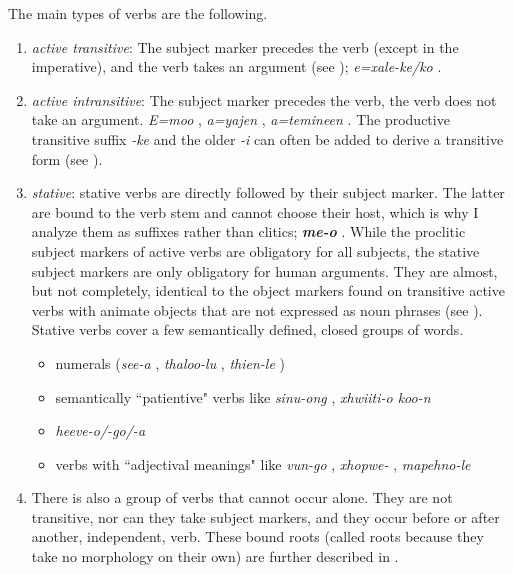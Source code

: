 The main types of verbs are the following.
\begin{enumerate}
	\item \emph{active transitive}: The subject marker precedes the verb (except in the imperative), and the verb takes an argument (see ); \textit{{e=xale-ke/ko}} .
	
	\item \emph{active intransitive}: The subject marker precedes the verb, the verb does not take an argument. \textit{{E=moo}} , \textit{a=yajen} , \textit{a=temineen} . The productive transitive suffix \textit{-ke} and the older \textit{-i} can often be added to derive a transitive form (see ).
	
	\item \emph{stative}: stative verbs are directly followed by their subject marker. The latter are bound to the verb stem and cannot choose their host, which is why I analyze them as suffixes rather than clitics; \textbf{\textit{me-o}} . While the proclitic subject markers of active verbs are obligatory for all subjects, the stative subject markers are only obligatory for human arguments. They are almost, but not completely, identical to the object markers found on transitive active verbs with animate objects that are not expressed as noun phrases (see ). Stative verbs cover a few semantically defined, closed groups of words.
	\begin{itemize}
	\sloppy
		\item numerals (\textit{see-a} , \textit{thaloo-lu} , \textit{thien-le} )
		\item semantically ``patientive" verbs like \textit{sinu-ong}  , \textit{xhwiiti-o koo-n}  
		\item \textit{heeve-o/-go/-a}  
		\item verbs with ``adjectival meanings" like \textit{vun-go}  , \textit{xhopwe-} , \textit{mapehno-le} 
	\end{itemize}
	\item There is also a group of verbs that cannot occur alone. They are not transitive, nor can they take subject markers, and they occur before or after another, independent, verb. These bound roots (called roots because they take no morphology on their own) are further described in .%
\end{enumerate}

